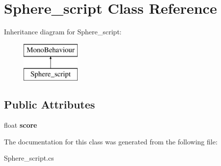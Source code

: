 \hypertarget{class_sphere__script}{}\section{Sphere\+\_\+script Class Reference}
\label{class_sphere__script}
Inheritance diagram for Sphere\+\_\+script\+:\begin{figure}[H]
\begin{center}
\leavevmode
\includegraphics[height=2.000000cm]{class_sphere__script}
\end{center}
\end{figure}
\subsection*{Public Attributes}
\begin{DoxyCompactItemize}
\item 
\mbox{\label{class_sphere__script_ab15a6da880ae1d16c57372b6e7c918f1}} 
float {\bfseries score}
\end{DoxyCompactItemize}


The documentation for this class was generated from the following file\+:\begin{DoxyCompactItemize}
\item 
Sphere\+\_\+script.\+cs\end{DoxyCompactItemize}
